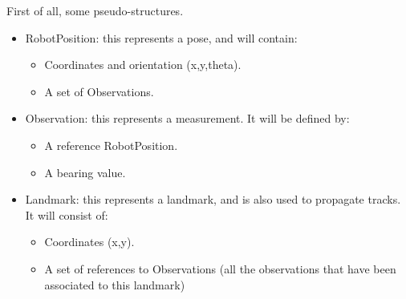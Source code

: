 First of all, some pseudo-structures.
\begin{itemize}
  \item RobotPosition: this represents a pose, and will contain:
    \begin{itemize}
      \item Coordinates and orientation (x,y,theta).
      \item A set of Observations.
    \end{itemize}
  \item Observation: this represents a measurement. It will be defined by:
    \begin{itemize}
      \item A reference RobotPosition.
      \item A bearing value.
    \end{itemize}
  \item Landmark: this represents a landmark, and is also used to propagate tracks. It will consist of:
    \begin{itemize}
      \item Coordinates (x,y).
      \item A set of references to Observations (all the observations that have been associated to this landmark)
    \end{itemize}
\end{itemize}

